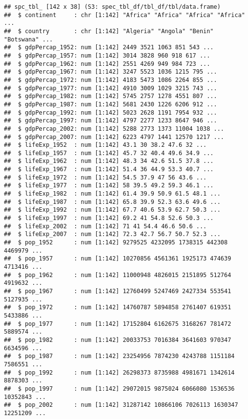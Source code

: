 \documentclass[
]{article}
\begin{document}
\begin{verbatim}
## spc_tbl_ [142 x 38] (S3: spec_tbl_df/tbl_df/tbl/data.frame)
##  $ continent     : chr [1:142] "Africa" "Africa" "Africa" "Africa" ...
##  $ country       : chr [1:142] "Algeria" "Angola" "Benin" "Botswana" ...
##  $ gdpPercap_1952: num [1:142] 2449 3521 1063 851 543 ...
##  $ gdpPercap_1957: num [1:142] 3014 3828 960 918 617 ...
##  $ gdpPercap_1962: num [1:142] 2551 4269 949 984 723 ...
##  $ gdpPercap_1967: num [1:142] 3247 5523 1036 1215 795 ...
##  $ gdpPercap_1972: num [1:142] 4183 5473 1086 2264 855 ...
##  $ gdpPercap_1977: num [1:142] 4910 3009 1029 3215 743 ...
##  $ gdpPercap_1982: num [1:142] 5745 2757 1278 4551 807 ...
##  $ gdpPercap_1987: num [1:142] 5681 2430 1226 6206 912 ...
##  $ gdpPercap_1992: num [1:142] 5023 2628 1191 7954 932 ...
##  $ gdpPercap_1997: num [1:142] 4797 2277 1233 8647 946 ...
##  $ gdpPercap_2002: num [1:142] 5288 2773 1373 11004 1038 ...
##  $ gdpPercap_2007: num [1:142] 6223 4797 1441 12570 1217 ...
##  $ lifeExp_1952  : num [1:142] 43.1 30 38.2 47.6 32 ...
##  $ lifeExp_1957  : num [1:142] 45.7 32 40.4 49.6 34.9 ...
##  $ lifeExp_1962  : num [1:142] 48.3 34 42.6 51.5 37.8 ...
##  $ lifeExp_1967  : num [1:142] 51.4 36 44.9 53.3 40.7 ...
##  $ lifeExp_1972  : num [1:142] 54.5 37.9 47 56 43.6 ...
##  $ lifeExp_1977  : num [1:142] 58 39.5 49.2 59.3 46.1 ...
##  $ lifeExp_1982  : num [1:142] 61.4 39.9 50.9 61.5 48.1 ...
##  $ lifeExp_1987  : num [1:142] 65.8 39.9 52.3 63.6 49.6 ...
##  $ lifeExp_1992  : num [1:142] 67.7 40.6 53.9 62.7 50.3 ...
##  $ lifeExp_1997  : num [1:142] 69.2 41 54.8 52.6 50.3 ...
##  $ lifeExp_2002  : num [1:142] 71 41 54.4 46.6 50.6 ...
##  $ lifeExp_2007  : num [1:142] 72.3 42.7 56.7 50.7 52.3 ...
##  $ pop_1952      : num [1:142] 9279525 4232095 1738315 442308 4469979 ...
##  $ pop_1957      : num [1:142] 10270856 4561361 1925173 474639 4713416 ...
##  $ pop_1962      : num [1:142] 11000948 4826015 2151895 512764 4919632 ...
##  $ pop_1967      : num [1:142] 12760499 5247469 2427334 553541 5127935 ...
##  $ pop_1972      : num [1:142] 14760787 5894858 2761407 619351 5433886 ...
##  $ pop_1977      : num [1:142] 17152804 6162675 3168267 781472 5889574 ...
##  $ pop_1982      : num [1:142] 20033753 7016384 3641603 970347 6634596 ...
##  $ pop_1987      : num [1:142] 23254956 7874230 4243788 1151184 7586551 ...
##  $ pop_1992      : num [1:142] 26298373 8735988 4981671 1342614 8878303 ...
##  $ pop_1997      : num [1:142] 29072015 9875024 6066080 1536536 10352843 ...
##  $ pop_2002      : num [1:142] 31287142 10866106 7026113 1630347 12251209 ...

\end{verbatim}
\end{document}
